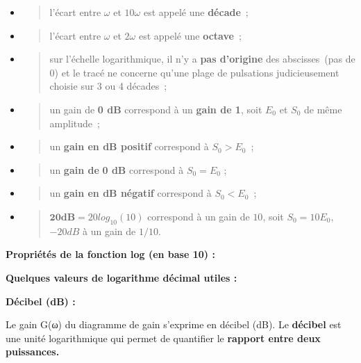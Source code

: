 \begin{itemize}
\item
  \begin{quote}
  l'écart entre \(\omega\) et \(10\omega\) est appelé une \textbf{décade}~;
  \end{quote}
\item
  \begin{quote}
  l'écart entre \(\omega\) et \(2\omega\) est appelé une \textbf{octave}~;
  \end{quote}
\item
  \begin{quote}
  sur l'échelle logarithmique, il n'y a \textbf{pas d'origine} des abscisses~(pas de 0) et le tracé ne concerne qu'une plage de pulsations judicieusement choisie sur 3 ou 4 décades~;
  \end{quote}
\item
  \begin{quote}
  un gain de \textbf{0 dB} correspond à un \textbf{gain de 1}, soit \(E_{0}\) et \(S_{0}\) de même amplitude~;
  \end{quote}
\item
  \begin{quote}
  un \textbf{gain en dB positif} correspond à \(S_{0} > E_{0}\)~;
  \end{quote}
\item
  \begin{quote}
  un \textbf{gain de} \textbf{0 dB} correspond à \(S_{0} = E_{0}\) ;
  \end{quote}
\item
  \begin{quote}
  un \textbf{gain en dB négatif} correspond à \(S_{0} < E_{0}\)~;
  \end{quote}
\item
  \begin{quote}
  \(\mathbf{20}\mathbf{dB =}20{log_{10}}(10)\) correspond à un gain de \(10\), soit \(S_{0} = 10E_{0}\), \(- 20dB\) à un gain de \(1/10\).
  \end{quote}
\end{itemize}

\textbf{Propriétés de la fonction log (en base 10) :}

\textbf{Quelques valeurs de logarithme décimal utiles :}

\textbf{Décibel (dB) :}

Le gain G(ω) du diagramme de gain s'exprime en décibel (dB). Le \textbf{décibel} est une unité logarithmique qui permet de quantifier le \textbf{rapport entre deux puissances.}


